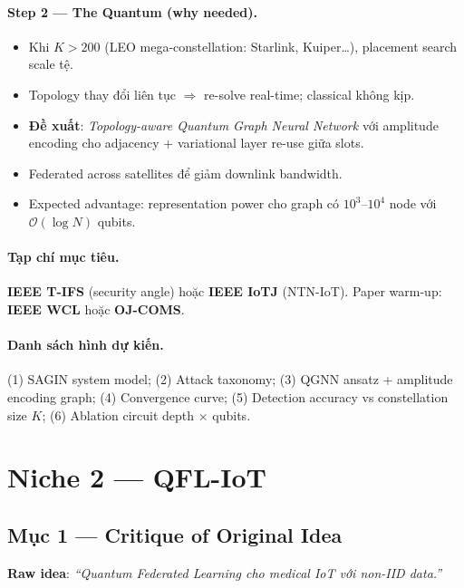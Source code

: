 \documentclass[11pt,a4paper]{article}
\begin{document}
\paragraph{Step 2 --- The Quantum (why needed).}
\begin{itemize}
  \item Khi $K > 200$ (LEO mega-constellation: Starlink, Kuiper\dots), placement search scale tệ.
  \item Topology thay đổi liên tục $\Rightarrow$ re-solve real-time; classical không kịp.
  \item \textbf{Đề xuất}: \textit{Topology-aware Quantum Graph Neural Network} với amplitude encoding cho adjacency + variational layer re-use giữa slots.
  \item Federated across satellites để giảm downlink bandwidth.
  \item Expected advantage: representation power cho graph có $10^3$--$10^4$ node với $\mathcal{O}(\log N)$ qubits.
\end{itemize}

\paragraph{Tạp chí mục tiêu.}
\textbf{IEEE T-IFS} (security angle) hoặc \textbf{IEEE IoTJ} (NTN-IoT). Paper warm-up: \textbf{IEEE WCL} hoặc \textbf{OJ-COMS}.

\paragraph{Danh sách hình dự kiến.}
(1) SAGIN system model; (2) Attack taxonomy; (3) QGNN ansatz + amplitude encoding graph; (4) Convergence curve; (5) Detection accuracy vs constellation size $K$; (6) Ablation circuit depth $\times$ qubits.

\section{Niche 2 --- QFL-IoT}

\subsection{Mục 1 --- Critique of Original Idea}

\textbf{Raw idea}: \textit{``Quantum Federated Learning cho medical IoT với non-IID data.''}
\end{document}

